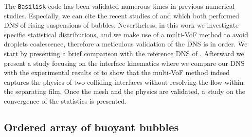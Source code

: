 The \texttt{Basilisk} code has been validated numerous times in previous numerical studies. 
Especially, we can cite the recent studies of \citet{innocenti2020direct} and \citet{hidman2023assessing} which both performed DNS of rising suspensions of bubbles. 
Nevertheless, in this work we investigate specific statistical distributions,
and we make use of a multi-VoF method to avoid droplets coalescence, therefore a meticulous validation of the DNS is in order. 
We start by presenting a brief comparison with the reference DNS of \citet{esmaeeli1999direct}. 
Afterward we present a study focusing on the interface kinematics where we compare our DNS with the experimental results of \citet{mohamed2003drop} to show that the multi-VoF method indeed captures the physics of two colliding interfaces without resolving the flow within the separating film. 
Once the mesh and the physics are validated, a study on the convergence of the statistics is presented. 

\subsection*{Ordered array of buoyant bubbles}


